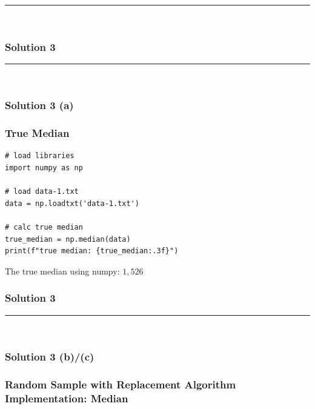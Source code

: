 \documentclass{article}
\begin{document}
\noindent\rule{\textwidth}{0.4pt}\\

\newpage
\subsubsection*{Solution 3}
\noindent\rule{\textwidth}{0.4pt}\\
\subsubsection*{Solution 3 (a)}
\subsubsection*{True Median}

\begin{lstlisting}
# load libraries
import numpy as np

# load data-1.txt
data = np.loadtxt('data-1.txt')

# calc true median
true_median = np.median(data)
print(f"true median: {true_median:.3f}")
\end{lstlisting}

\parbox{\textwidth}{
The true median using numpy: $1,526$
}

\newpage
\subsubsection*{Solution 3}
\noindent\rule{\textwidth}{0.4pt}\\
\subsubsection*{Solution 3 (b)/(c)}
\subsubsection*{Random Sample with Replacement Algorithm Implementation: Median}
\end{document}
